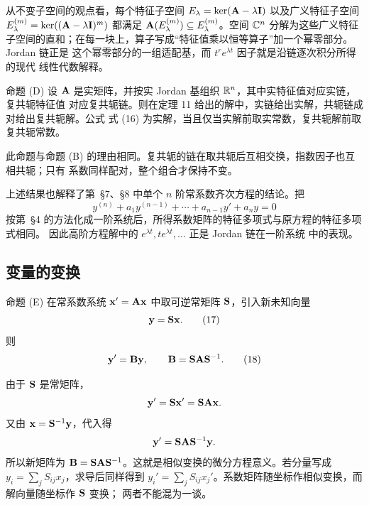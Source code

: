 从不变子空间的观点看，每个特征子空间
\(E_\lambda=\ker(\mathbf{A}-\lambda \mathbf{I})\) 以及广义特征子空间
\(E_\lambda^{(m)}=\ker((\mathbf{A}-\lambda \mathbf{I})^m)\) 都满足
\(\mathbf{A}(E_\lambda^{(m)})\subseteq E_\lambda^{(m)}\)。空间 \(\mathbb C^n\) 分解为这些广义特征
子空间的直和；在每一块上，算子写成“特征值乘以恒等算子”加一个幂零部分。Jordan 链正是
这个幂零部分的一组适配基，而 \(t^r e^{\lambda t}\) 因子就是沿链逐次积分所得的现代
线性代数解释。

\begin{sourceitem}{命题 (D)}
设 \(\mathbf{A}\) 是实矩阵，并按实 Jordan 基组织 \(\mathbb R^n\)，其中实特征值对应实链，复共轭特征值
对应复共轭链。则在定理 11 给出的解中，实链给出实解，共轭链成对给出复共轭解。公式
式 (16) 为实解，当且仅当实解前取实常数，复共轭解前取复共轭常数。
\end{sourceitem}

此命题与命题 (B) 的理由相同。复共轭的链在取共轭后互相交换，指数因子也互相共轭；只有
系数同样配对，整个组合才保持不变。

上述结果也解释了第~\S7、\S8 中单个 \(n\) 阶常系数齐次方程的结论。把
\[
 y^{(n)}+a_1y^{(n-1)}+\cdots+a_{n-1}y'+a_ny=0
\]
按第~\S4 的方法化成一阶系统后，所得系数矩阵的特征多项式与原方程的特征多项式相同。
因此高阶方程解中的 \(e^{\lambda t},te^{\lambda t},\ldots\) 正是 Jordan 链在一阶系统
中的表现。

\subsection*{变量的变换}

\begin{sourceitem}{命题 (E)}
在常系数系统 \(\vect{x}'=\mat{A}\vect{x}\) 中取可逆常矩阵 \(\mathbf{S}\)，引入新未知向量
\begin{equation}
 \vect{y}=\mat{S}\vect{x}.
 \tag{17}
\end{equation}
则
\begin{equation}
 \vect{y}'=\mat{B}\vect{y},\qquad \mat{B}=\mat{S}\mat{A}\mat{S}^{-1}.
 \tag{18}
 \end{equation}
\end{sourceitem}

由于 \(\mathbf{S}\) 是常矩阵，
\[
 \vect{y}'=\mat{S}\vect{x}'=\mat{S}\mat{A}\vect{x}.
\]
又由 \(\vect{x}=\mat{S}^{-1}\vect{y}\)，代入得
\[
 \vect{y}'=\mat{S}\mat{A}\mat{S}^{-1}\vect{y}.
\]
所以新矩阵为 \(\mathbf{B}=\mathbf{S}\mathbf{A}\mathbf{S}^{-1}\)。这就是相似变换的微分方程意义。若分量写成
\(y_i=\sum_jS_{ij}x_j\)，求导后同样得到
\(y_i'=\sum_jS_{ij}x_j'\)。系数矩阵随坐标作相似变换，而解向量随坐标作 \(\mathbf{S}\) 变换；
两者不能混为一谈。

